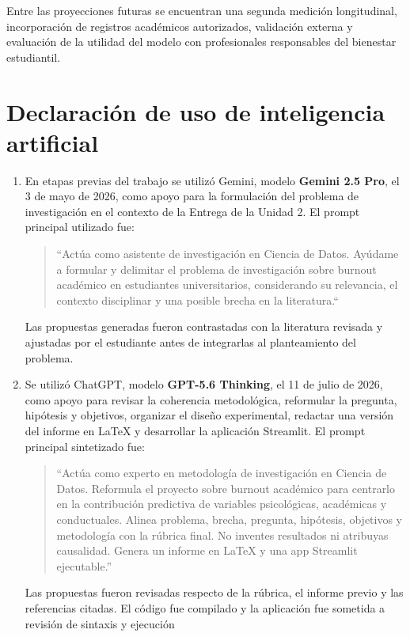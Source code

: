 \documentclass[11pt,a4paper]{article}
\begin{document}
Entre las proyecciones futuras se encuentran una segunda medición longitudinal, incorporación de registros académicos autorizados, validación externa y evaluación de la utilidad del modelo con profesionales responsables del bienestar estudiantil.

\section{Declaración de uso de inteligencia artificial}
\begin{enumerate}
  \item En etapas previas del trabajo se utilizó Gemini, modelo \textbf{Gemini 2.5 Pro}, el 3 de mayo de 2026, como apoyo para la formulación del problema de investigación en el contexto de la Entrega de la Unidad 2. El prompt principal utilizado fue:

\begin{quote}
\small
``Actúa como asistente de investigación en Ciencia de Datos. Ayúdame a formular y delimitar el problema de investigación sobre burnout académico en estudiantes universitarios, considerando su relevancia, el contexto disciplinar y una posible brecha en la literatura.``
\end{quote}

Las propuestas generadas fueron contrastadas con la literatura revisada y ajustadas por el estudiante antes de integrarlas al planteamiento del problema. 

  \item Se utilizó ChatGPT, modelo \textbf{GPT-5.6 Thinking}, el 11 de julio de 2026, como apoyo para revisar la coherencia metodológica, reformular la pregunta, hipótesis y objetivos, organizar el diseño experimental, redactar una versión del informe en \LaTeX{} y desarrollar la aplicación Streamlit. El prompt principal sintetizado fue:

\begin{quote}
\small
``Actúa como experto en metodología de investigación en Ciencia de Datos. Reformula el proyecto sobre burnout académico para centrarlo en la contribución predictiva de variables psicológicas, académicas y conductuales. Alinea problema, brecha, pregunta, hipótesis, objetivos y metodología con la rúbrica final. No inventes resultados ni atribuyas causalidad. Genera un informe en LaTeX y una app Streamlit ejecutable.''
\end{quote}

Las propuestas fueron revisadas respecto de la rúbrica, el informe previo y las referencias citadas. El código fue compilado y la aplicación fue sometida a revisión de sintaxis y ejecución


\end{enumerate}
\end{document}
